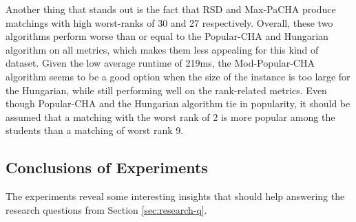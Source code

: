 \begin{table}[h!]
  \centering
  \caption{Average results for large uniform dataset with complete preferences.}
  \label{tab:results-uniform-large-complete}
\end{table}

Another thing that stands out is the fact that RSD and Max-PaCHA produce matchings with high worst-ranks of 30 and 27 respectively. Overall, these two algorithms perform worse than or equal to the Popular-CHA and Hungarian algorithm on all metrics, which makes them less appealing for this kind of dataset. Given the low average runtime of 219ms, the Mod-Popular-CHA algorithm seems to be a good option when the size of the instance is too large for the Hungarian, while still performing well on the rank-related metrics. Even though Popular-CHA and the Hungarian algorithm tie in popularity, it should be assumed that a matching with the worst rank of 2 is more popular among the students than a matching of worst rank 9. 

\subsection{Conclusions of Experiments}
The experiments reveal some interesting insights that should help answering the research questions from Section \ref{sec:research-q}.

